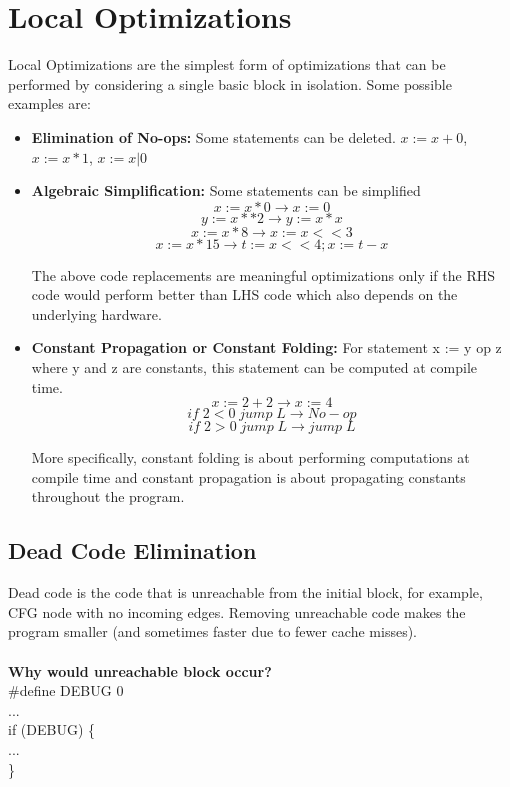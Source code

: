 \section{Local Optimizations}

Local Optimizations are the simplest form of optimizations that can be performed by considering a single basic block in isolation. Some possible examples are:

\begin{itemize}
    \item \textbf{Elimination of No-ops:} Some statements can be deleted. \(x := x + 0\), \(x := x * 1\), \(x := x | 0\)
    \item \textbf{Algebraic Simplification:} Some statements can be simplified
    \[x := x * 0 \rightarrow x := 0\]
    \[y := x ** 2 \rightarrow y := x * x\]
    \[x := x * 8 \rightarrow x := x << 3\]
    \[x := x * 15 \rightarrow t := x << 4; x := t - x\]
    
    The above code replacements are meaningful optimizations only if the RHS code would perform better than LHS code which also depends on the underlying hardware.
    \item \textbf{Constant Propagation or Constant Folding:} For statement x := y op z where y and z are constants, this statement can be computed at compile time.
    \[x := 2 + 2 \rightarrow x := 4\]
    \[if\; 2 < 0\; jump\; L \rightarrow No-op\]
    \[if\;2>0\;jump\;L \rightarrow jump\;L\]
    
    More specifically, constant folding is about performing computations at compile time and constant propagation is about propagating constants throughout the program.
\end{itemize}

\subsection{Dead Code Elimination}

Dead code is the code that is unreachable from the initial block, for example, CFG node with no incoming edges. Removing unreachable code makes the program smaller (and sometimes faster due to fewer cache misses).
\\
\\
\textbf{Why would unreachable block occur?}
\\
\#define DEBUG 0
\\
...
\\
if (DEBUG) \{
\\
...
\\
\}
\\

